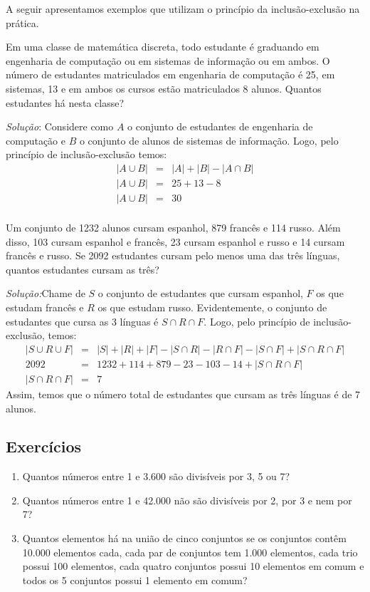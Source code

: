 A seguir apresentamos exemplos que utilizam o princípio da
inclusão-exclusão na prática.
\begin{Example}
Em uma classe de matemática discreta, todo estudante é graduando em
engenharia de computação ou em sistemas de informação ou em ambos. O
número de estudantes matriculados em engenharia de computação é 25, em
sistemas, 13 e em ambos os cursos estão matriculados 8 alunos. Quantos
estudantes há nesta classe?

\textit{Solução}: Considere como $A$ o conjunto de estudantes de
engenharia de computação e $B$ o conjunto de alunos de sistemas de
informação. Logo, pelo princípio de inclusão-exclusão temos:
\[
\begin{array}{lcl}
|A\cup B| & = & |A| + |B| - |A\cap B| \\
|A\cup B| & = & 25 + 13 - 8 \\
|A\cup B| & = & 30\\
\end{array}
\]
\end{Example}
\begin{Example}
Um conjunto de 1232 alunos cursam espanhol, 879 francês e 114
russo. Além disso, 103 cursam espanhol e francês, 23 cursam espanhol e
russo e 14 cursam francês e russo. Se 2092 estudantes cursam pelo
menos uma das três línguas, quantos estudantes cursam as três?

\textit{Solução:}Chame de $S$ o conjunto de estudantes que cursam
espanhol, $F$ os que estudam francês e $R$ os que estudam
russo. Evidentemente, o conjunto de estudantes que cursa as 3 línguas
é $S \cap R \cap F$. Logo, pelo princípio de inclusão-exclusão, temos:
\[
\begin{array}{lcl}
|S\cup R \cup F| & = & |S| + |R| + |F| - |S \cap R| - |R \cap F| - |S
\cap F| +|S\cap R \cap F| \\
       2092            & = & 1232 + 114 + 879 - 23 - 103 - 14 + |S\cap
       R \cap F|\\
|S\cap R\cap F| & = & 7
\end{array}
\]
Assim, temos que o número total de estudantes que cursam as três
línguas é de 7 alunos.
\end{Example}

\subsection{Exercícios}

\begin{enumerate}
  \item Quantos números entre 1 e 3.600 são divisíveis por 3, 5 ou 7?
  \item Quantos números entre 1 e 42.000 não são divisíveis por 2, por
    3 e nem por 7?
  \item Quantos elementos há na união de cinco conjuntos se os
    conjuntos contêm 10.000 elementos cada, cada par de conjuntos tem
    1.000 elementos, cada trio possui 100 elementos, cada quatro
    conjuntos possui 10 elementos em comum e todos os 5 conjuntos possui 1
    elemento em comum?
\end{enumerate}

